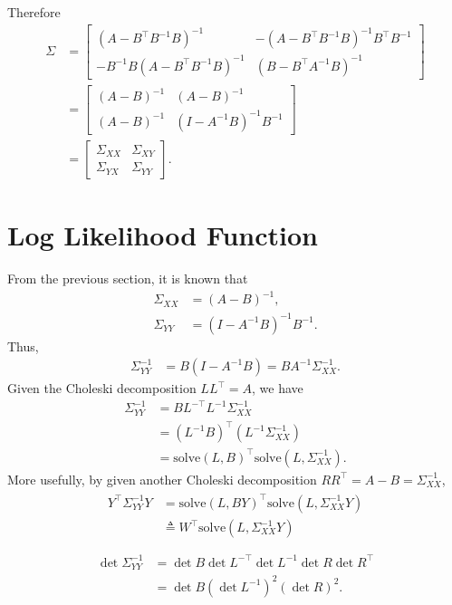 Therefore
\begin{align*}
\Sigma &= \begin{bmatrix}
(A-B^\top B^{-1}B) ^{-1} & -(A-B^\top B^{-1}B)^{-1}B^\top B^{-1}\\
- B^{-1}B(A-B^\top B^{-1}B)^{-1} & (B-B^\top A^{-1}B) ^{-1}
\end{bmatrix} \\
&= \begin{bmatrix}
(A-B) ^{-1} & (A-B)^{-1}\\
(A-B)^{-1} & (I- A^{-1}B) ^{-1}B^{-1}
\end{bmatrix} \\
&= \begin{bmatrix}
\Sigma_{XX} & \Sigma_{XY} \\
\Sigma_{YX}  &\Sigma_{YY} 
\end{bmatrix}.
\end{align*}


\section{Log Likelihood Function}

From the previous section, it is known that
\begin{align*}
\Sigma_{XX} &= (A-B)^{-1}, \\
\Sigma_{YY} &= (I-A^{-1}B)^{-1}B^{-1}.
\end{align*}
Thus, 
\begin{align*}
\Sigma_{YY}^{-1} &= B(I-A^{-1}B)= BA^{-1}\Sigma_{XX}^{-1}.
\end{align*}
Given the Choleski decomposition $LL^\top = A$, we have
\begin{align*}
\Sigma_{YY}^{-1} &=BL^{-\top}L^{-1}\Sigma_{XX}^{-1}\\
&=(L^{-1}B)^\top(L^{-1}\Sigma_{XX}^{-1})\\
&=\mbox{solve}(L,B)^\top\mbox{solve}(L,\Sigma_{XX}^{-1}).
\end{align*}
More usefully, by given another Choleski decomposition $RR^\top=A-B=\Sigma_{XX}^{-1}$,
\begin{align}\label{sigmayy01}
\begin{split}
Y^\top \Sigma_{YY}^{-1} Y &= \mbox{solve}(L,BY)^\top\mbox{solve}(L,\Sigma_{XX}^{-1}Y)\\
&\triangleq W^\top \mbox{solve}(L,\Sigma_{XX}^{-1}Y)\\
\end{split}
\end{align}
\begin{align}\label{sigmayy02}
\begin{split}
\det\Sigma_{YY}^{-1} &= \det B \det L^{-\top}\det L^{-1}\det R\det R^\top\\
&= \det B(\det L^{-1})^2(\det R)^2.
\end{split}
\end{align}

